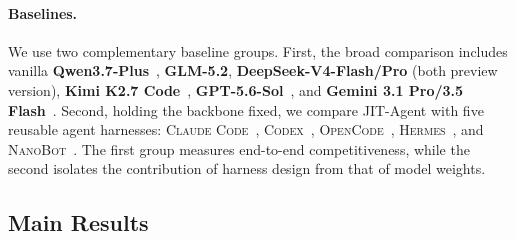 \documentclass{article}
\newcommand{\ourmethod}{JIT-Agent\xspace}
\begin{document}
\vspace{-0.5em}
\paragraph{Baselines.}
We use two complementary baseline groups. First, the broad comparison includes vanilla \textbf{Qwen3.7-Plus}~\citep{qwen2026qwen37plus}, \textbf{GLM-5.2}, \textbf{DeepSeek-V4-Flash/Pro} (both preview version), \textbf{Kimi K2.7 Code}~\citep{moonshot2026kimik27code}, \textbf{GPT-5.6-Sol}~\citep{openai2026gpt56}, and \textbf{Gemini 3.1 Pro/3.5 Flash}~\citep{google2026gemini31pro,google2026gemini35flash}. Second, holding the backbone fixed, we compare \ourmethod with five reusable agent harnesses: \textsc{Claude Code}~\citep{githubGitHubAnthropicsclaudecode}, \textsc{Codex}~\citep{openaiCodexCoding}, \textsc{OpenCode}~\citep{githubGitHubOpencodeaiopencode}, \textsc{Hermes}~\citep{nous2026hermes}, and \textsc{NanoBot}~\citep{hkuds2026nanobot}. The first group measures end-to-end competitiveness, while the second isolates the contribution of harness design from that of model weights.



\vspace{-0.5em}
\subsection{Main Results}
\vspace{-0.5em}

\newcommand{\resultblank}{\textemdash}
\end{document}

